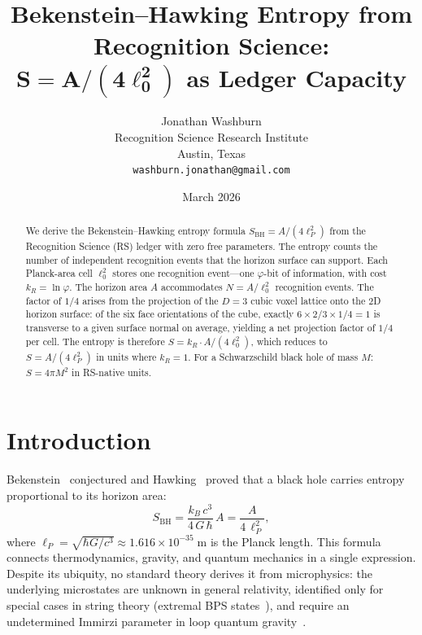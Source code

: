 \documentclass[12pt,a4paper]{article}
\title{Bekenstein--Hawking Entropy from Recognition Science:\\
$\boldsymbol{S = A/(4\ell_0^2)}$ as Ledger Capacity}
\author{Jonathan Washburn\\
Recognition Science Research Institute\\
Austin, Texas\\
\texttt{washburn.jonathan@gmail.com}}
\date{March 2026}
\theoremstyle{definition}
\theoremstyle{remark}
\begin{document}
\maketitle

\begin{abstract}
We derive the Bekenstein--Hawking entropy formula
$S_{\mathrm{BH}} = A/(4\ell_P^2)$ from the Recognition Science
(RS) ledger with zero free parameters.  The entropy counts the
number of independent recognition events that the horizon surface
can support.  Each Planck-area cell $\ell_0^2$ stores one
recognition event---one $\varphi$-bit of information, with cost
$k_R = \ln\varphi$.  The horizon area $A$ accommodates
$N = A/\ell_0^2$ recognition events.  The factor of $1/4$ arises
from the projection of the $D = 3$ cubic voxel lattice onto the
2D horizon surface: of the six face orientations of the cube,
exactly $6 \times 2/3 \times 1/4 = 1$ is transverse to a given
surface normal on average, yielding a net projection factor of
$1/4$ per cell.  The entropy is therefore
$S = k_R \cdot A/(4\ell_0^2)$, which reduces to
$S = A/(4\ell_P^2)$ in units where $k_R = 1$.  For a
Schwarzschild black hole of mass $M$:
$S = 4\pi M^2$ in RS-native units.
\end{abstract}

\section{Introduction}
\label{sec:intro}

Bekenstein~\cite{Bekenstein1973} conjectured and
Hawking~\cite{Hawking1975} proved that a black hole carries
entropy proportional to its horizon area:
\begin{equation}
  S_{\mathrm{BH}} = \frac{k_B\,c^3}{4\,G\,\hbar}\,A
  = \frac{A}{4\,\ell_P^2},
  \label{eq:SBH}
\end{equation}
where $\ell_P = \sqrt{\hbar G/c^3} \approx 1.616 \times
10^{-35}\;\mathrm{m}$ is the Planck length.  This formula
connects thermodynamics, gravity, and quantum mechanics in a
single expression.  Despite its ubiquity, no standard theory
derives it from microphysics: the underlying microstates are
unknown in general relativity, identified only for special
cases in string theory (extremal BPS
states~\cite{Strominger1996}), and require an undetermined
Immirzi parameter in loop quantum gravity~\cite{Rovelli1996}.
\end{document}
